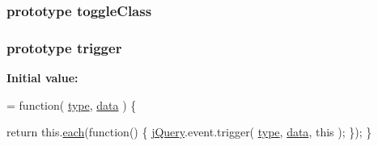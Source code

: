 \subsubsection[{toggle\+Class}]{ {\bf prototype} toggle\+Class}\label{jquery-1_810_82-vsdoc_8js_aa7d62d93d395f57a19fbbdcfd7ff87f1}
\hypertarget{jquery-1_810_82-vsdoc_8js_a2388c4114d5e3e4eab020f973641519c}{}
\subsubsection[{trigger}]{ {\bf prototype} trigger}\label{jquery-1_810_82-vsdoc_8js_a2388c4114d5e3e4eab020f973641519c}
{\bfseries Initial value\+:}
\begin{DoxyCode}
= \textcolor{keyword}{function}( \hyperlink{jquery-1_810_82-vsdoc_8js_a3940565e83a9bfd10d95ffd27536da91}{type}, \hyperlink{jquery-1_810_82-vsdoc_8js_a609407b3456fdc3c5671a9fc4a226ff7}{data} ) \{


        \textcolor{keywordflow}{return} this.\hyperlink{jquery-1_810_82-vsdoc_8js_aae0bcb6b00035445a8f9b262c96ea8a2}{each}(\textcolor{keyword}{function}() \{
            \hyperlink{jquery-1_810_82-vsdoc_8js_add5237586d970a38a81f990e8eb28c6c}{jQuery}.event.trigger( \hyperlink{jquery-1_810_82-vsdoc_8js_a3940565e83a9bfd10d95ffd27536da91}{type}, \hyperlink{jquery-1_810_82-vsdoc_8js_a609407b3456fdc3c5671a9fc4a226ff7}{data}, \textcolor{keyword}{this} );
        \});
    \}
\end{DoxyCode}
\hypertarget{jquery-1_810_82-vsdoc_8js_afe18935b86e978c91a4ae291ad8825c8}{}
